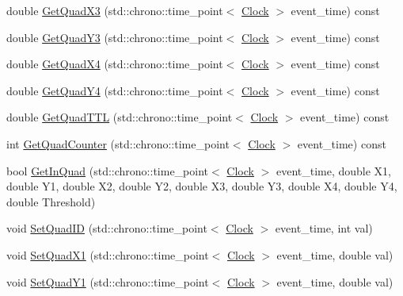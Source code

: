 \begin{DoxyCompactItemize}
\item 
double \hyperlink{class_quad_aaa044d9683717efd054d82f553b3337d}{Get\+Quad\+X3} (std\+::chrono\+::time\+\_\+point$<$ \hyperlink{universe_8h_a0ef8d951d1ca5ab3cfaf7ab4c7a6fd80}{Clock} $>$ event\+\_\+time) const
\item 
double \hyperlink{class_quad_a9cdb9ea12e3aa3eb0e471015d4cb46bb}{Get\+Quad\+Y3} (std\+::chrono\+::time\+\_\+point$<$ \hyperlink{universe_8h_a0ef8d951d1ca5ab3cfaf7ab4c7a6fd80}{Clock} $>$ event\+\_\+time) const
\item 
double \hyperlink{class_quad_a07884076387e255aa09ca8b0ac7ff599}{Get\+Quad\+X4} (std\+::chrono\+::time\+\_\+point$<$ \hyperlink{universe_8h_a0ef8d951d1ca5ab3cfaf7ab4c7a6fd80}{Clock} $>$ event\+\_\+time) const
\item 
double \hyperlink{class_quad_aff3097e4988549376102daf18b582a0b}{Get\+Quad\+Y4} (std\+::chrono\+::time\+\_\+point$<$ \hyperlink{universe_8h_a0ef8d951d1ca5ab3cfaf7ab4c7a6fd80}{Clock} $>$ event\+\_\+time) const
\item 
double \hyperlink{class_quad_ab17ff4d689675e80107ecf6588811eee}{Get\+Quad\+T\+TL} (std\+::chrono\+::time\+\_\+point$<$ \hyperlink{universe_8h_a0ef8d951d1ca5ab3cfaf7ab4c7a6fd80}{Clock} $>$ event\+\_\+time) const
\item 
int \hyperlink{class_quad_a56ac193fa18af6ec468463cc16588cc1}{Get\+Quad\+Counter} (std\+::chrono\+::time\+\_\+point$<$ \hyperlink{universe_8h_a0ef8d951d1ca5ab3cfaf7ab4c7a6fd80}{Clock} $>$ event\+\_\+time) const
\item 
bool \hyperlink{class_quad_a80c2eb7c282e1566c5f7f235611b6206}{Get\+In\+Quad} (std\+::chrono\+::time\+\_\+point$<$ \hyperlink{universe_8h_a0ef8d951d1ca5ab3cfaf7ab4c7a6fd80}{Clock} $>$ event\+\_\+time, double X1, double Y1, double X2, double Y2, double X3, double Y3, double X4, double Y4, double Threshold)
\item 
void \hyperlink{class_quad_a9900acc75445ebc71aba2307e3fe0131}{Set\+Quad\+ID} (std\+::chrono\+::time\+\_\+point$<$ \hyperlink{universe_8h_a0ef8d951d1ca5ab3cfaf7ab4c7a6fd80}{Clock} $>$ event\+\_\+time, int val)
\item 
void \hyperlink{class_quad_a05fb7c22bfef542b99d04f968b4e18ab}{Set\+Quad\+X1} (std\+::chrono\+::time\+\_\+point$<$ \hyperlink{universe_8h_a0ef8d951d1ca5ab3cfaf7ab4c7a6fd80}{Clock} $>$ event\+\_\+time, double val)
\item 
void \hyperlink{class_quad_a3f0f9162be2b1ec2e2597a163586fb01}{Set\+Quad\+Y1} (std\+::chrono\+::time\+\_\+point$<$ \hyperlink{universe_8h_a0ef8d951d1ca5ab3cfaf7ab4c7a6fd80}{Clock} $>$ event\+\_\+time, double val)

\end{DoxyCompactItemize}
